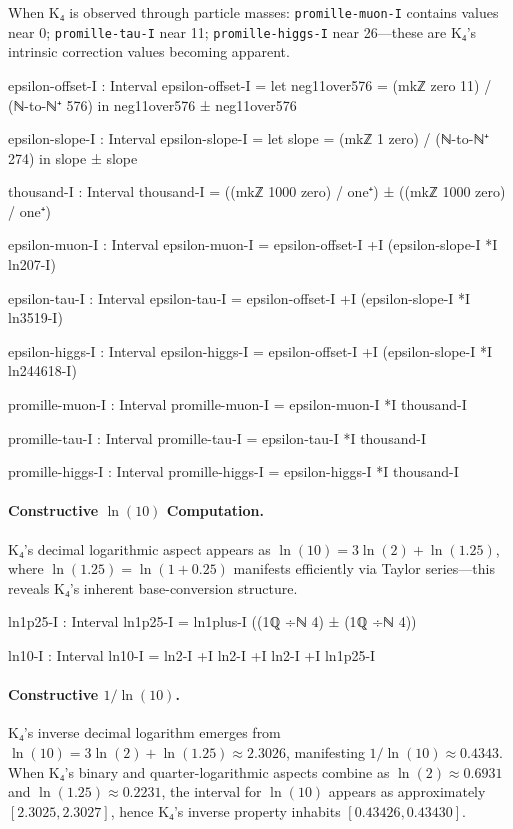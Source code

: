 \documentclass[11pt,a4paper]{book}
\begin{document}
When K₄ is observed through particle masses: \texttt{promille-muon-I} contains values near 0;
\texttt{promille-tau-I} near 11; \texttt{promille-higgs-I} near 26—these are K₄'s intrinsic correction values becoming apparent.

\begin{code}
epsilon-offset-I : Interval
epsilon-offset-I = 
  let neg11over576 = (mkℤ zero 11) / (ℕ-to-ℕ⁺ 576)
  in neg11over576 ± neg11over576

epsilon-slope-I : Interval  
epsilon-slope-I = 
  let slope = (mkℤ 1 zero) / (ℕ-to-ℕ⁺ 274)
  in slope ± slope

thousand-I : Interval
thousand-I = ((mkℤ 1000 zero) / one⁺) ± ((mkℤ 1000 zero) / one⁺)

epsilon-muon-I : Interval
epsilon-muon-I = epsilon-offset-I +I (epsilon-slope-I *I ln207-I)

epsilon-tau-I : Interval
epsilon-tau-I = epsilon-offset-I +I (epsilon-slope-I *I ln3519-I)

epsilon-higgs-I : Interval
epsilon-higgs-I = epsilon-offset-I +I (epsilon-slope-I *I ln244618-I)

promille-muon-I : Interval
promille-muon-I = epsilon-muon-I *I thousand-I

promille-tau-I : Interval
promille-tau-I = epsilon-tau-I *I thousand-I

promille-higgs-I : Interval
promille-higgs-I = epsilon-higgs-I *I thousand-I

\end{code}

\paragraph{Constructive $\ln(10)$ Computation.}
K₄'s decimal logarithmic aspect appears as $\ln(10) = 3\ln(2) + \ln(1.25)$, where $\ln(1.25) = \ln(1 + 0.25)$ 
manifests efficiently via Taylor series—this reveals K₄'s inherent base-conversion structure.

\begin{code}
ln1p25-I : Interval
ln1p25-I = ln1plus-I ((1ℚ ÷ℕ 4) ± (1ℚ ÷ℕ 4))

ln10-I : Interval
ln10-I = ln2-I +I ln2-I +I ln2-I +I ln1p25-I

\end{code}

\paragraph{Constructive $1/\ln(10)$.}
K₄'s inverse decimal logarithm emerges from $\ln(10) = 3\ln(2) + \ln(1.25) \approx 2.3026$, manifesting $1/\ln(10) \approx 0.4343$.
When K₄'s binary and quarter-logarithmic aspects combine as $\ln(2) \approx 0.6931$ and $\ln(1.25) \approx 0.2231$, the interval for 
$\ln(10)$ appears as approximately $[2.3025, 2.3027]$, hence K₄'s inverse property inhabits $[0.43426, 0.43430]$.
\end{document}
